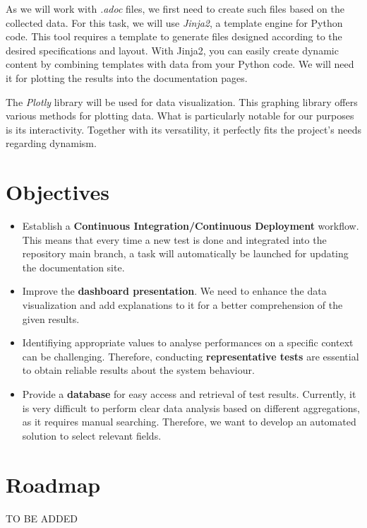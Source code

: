 \documentclass[12pt]{article}
\begin{document}
As we will work with \textit{.adoc} files, we first need to create such files based on the collected data.
For this task, we will use \textit{Jinja2}\cite*{Jinja2}, a template engine for Python code.
This tool requires a template to generate files designed according to the desired specifications and layout.
With Jinja2, you can easily create dynamic content by combining templates with data from your Python code.
We will need it for plotting the results into the documentation pages.


The \textit{Plotly}\cite*{Plotly} library will be used for data visualization. This graphing library offers various methods for plotting data.
What is particularly notable for our purposes is its interactivity. Together with its versatility, it perfectly fits the project's needs
regarding dynamism.

\section{Objectives}
\begin{itemize}
    \item Establish a \textbf{Continuous Integration/Continuous Deployment} workflow. 
    This means that every time a new test is done and integrated into the repository main branch, a task will automatically be launched for updating the documentation site. \\
    \item Improve the \textbf{dashboard presentation}. We need to enhance the data visualization and add explanations to it for a better comprehension of the given results. \\
    \item Identifiying appropriate values to analyse performances on a specific context can be challenging. Therefore, conducting \textbf{representative tests} are essential to obtain reliable results about the system behaviour. \\
    \item Provide a \textbf{database} for easy access and retrieval of test results.
    Currently, it is very difficult to perform clear data analysis based on different aggregations, as it requires manual searching.
    Therefore, we want to develop an automated solution to select relevant fields.

\end{itemize}

\newpage
\section{Roadmap}
TO BE ADDED
\end{document}
